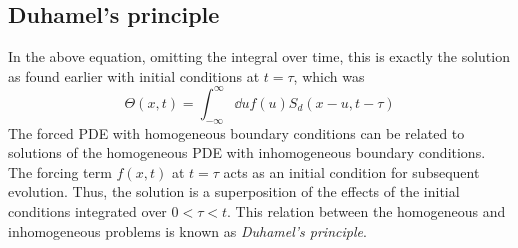 \subsection{Duhamel's principle}
In the above equation, omitting the integral over time, this is exactly the solution as found earlier with initial conditions at \( t = \tau \), which was
\[
	\Theta(x,t) = \int_{-\infty}^\infty \dd{u} f(u) S_d(x-u, t-\tau)
\]
The forced PDE with homogeneous boundary conditions can be related to solutions of the homogeneous PDE with inhomogeneous boundary conditions.
The forcing term \( f(x,t) \) at \( t = \tau \) acts as an initial condition for subsequent evolution.
Thus, the solution is a superposition of the effects of the initial conditions integrated over \( 0 < \tau < t \).
This relation between the homogeneous and inhomogeneous problems is known as \textit{Duhamel's principle}.

